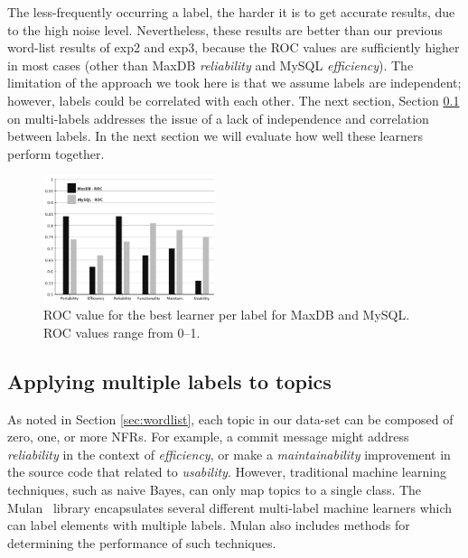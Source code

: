 \documentclass[]{sig-alternate}
\begin{document}
The less-frequently occurring a label, the harder it is to get accurate
results, due to the high noise level. Nevertheless, these results are
better than our previous word-list results of \textsf{exp2} and
\textsf{exp3}, because the ROC values are sufficiently higher in most
cases (other than MaxDB \emph{reliability} and MySQL \emph{efficiency}). The
limitation of the approach we took here is that we assume labels are
independent; however, labels could be correlated with each other. 
The next section, Section \ref{sec:multilabel} on multi-labels
addresses the issue of a lack of independence and correlation between labels.
In the next section we will evaluate how well these learners perform
together.

\begin{figure}
\centering
\includegraphics[width=0.45\textwidth]{figures/both-supervised}
\caption[]{ROC value for the best learner per label for MaxDB and MySQL. ROC values range from 0--1.
}
\label{fig:best-learn-per-tag}
\end{figure}

\subsection{Applying multiple labels to topics}
\label{sec:multilabel}

As noted in Section \ref{sec:wordlist}, each topic in our data-set can be composed of zero, one, or more NFRs. 
For example, a commit message might address \textit{reliability} in the context of \textit{efficiency}, or make a \textit{maintainability} improvement in the source code that related to \textit{usability}. 
However, traditional machine learning techniques, such as naive Bayes, can only map topics to a single class. 
The Mulan~\cite{mulan} library encapsulates several different multi-label machine learners which can label elements with multiple labels.
Mulan also includes methods for determining the performance of such techniques.
\end{document}

